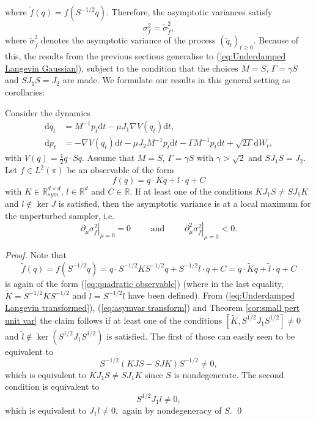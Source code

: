 where $\widetilde{f}(q)=f(S^{-1/2}q)$. Therefore, the asymptotic variances
satisfy
\begin{equation}
\sigma_{f}^{2}=\widetilde{\sigma}_{\widetilde{f}}^{2},\label{eq:asymvar transform}
\end{equation}
where $\widetilde{\sigma}_{\widetilde{f}}^{2}$ denotes the asymptotic variance
of the process $(\widetilde{q}_{t})_{t\ge0}$. Because of this, the results
from the previous sections generalise to (\ref{eq:Underdamped Langevin Gaussian}),
subject to the condition that the choices $M=S$, $\Gamma=\gamma S$
and $SJ_{1}S=J_{2}$ are made. We formulate our results in this general
setting as corollaries:
\begin{corollary}
	\label{cor:small_pert_general}
	Consider the dynamics 
	\begin{align}
	\mathrm{d}q_{t} & =M^{-1}p_{t}\mathrm{d}t-\mu J_{1}\nabla V(q_{t})\mathrm{d}t,\nonumber \\
	\mathrm{d}p_{t} & =-\nabla V(q_{t})\mathrm{d}t-\mu J_{2}M^{-1}p_{t}\mathrm{d}t-\Gamma M^{-1}p_{t}\mathrm{d}t+\sqrt{2\Gamma}\mathrm{d}W_{t},\label{eq: perturbed Langevin corollary}
	\end{align}
	with $V(q)=\frac{1}{2}q\cdot Sq$. Assume that $M=S$, $\Gamma=\gamma S$
	with $\gamma > \sqrt{2}$ and $SJ_{1}S=J_{2}$. Let $f\in L^{2}(\pi)$ be an observable of the form 
	\begin{equation}
	f(q)=q\cdot Kq+l\cdot q+C\label{eq:quadratic observable}
	\end{equation}
	with $K\in\mathbb{R}_{sym}^{d\times d}$, $l\in\mathbb{R}^{d}$ and
	$C\in\mathbb{R}$. If at least one of the conditions $KJ_{1}S\neq SJ_{1}K$
	and $l \notin \ker J$ is satisfied, then the asymptotic variance is at a local maximum for the unperturbed sampler, i.e.
	\[
	\left. \partial_{\mu}\sigma_{f}^{2}\right\rvert_{\mu=0}=0\qquad \mbox{ and } \qquad 	\left. \partial_{\mu}^{2}\sigma_{f}^{2}\right\rvert_{\mu=0}<0.
	\]
\end{corollary}
\begin{proof}
	Note that 
	\[
	\widetilde{f}(q)=f(S^{-1/2}q)=q\cdot S^{-1/2}KS^{-1/2}q+S^{-1/2}l\cdot q+C=q\cdot\widetilde{K}q+\widetilde{l}\cdot q+C
	\]
	is again of the form (\ref{eq:quadratic observable}) (where in the
	last equality, $\widetilde{K}=S^{-1/2}KS^{-1/2}$ and $\widetilde{l}=S^{-1/2}l$
	have been defined). From (\ref{eq:Underdamped Langevin transformed}),
	(\ref{eq:asymvar transform}) and Theorem \ref{cor:small pert unit var}
	the claim follows if at least one of the conditions $[\widetilde{K},S^{1/2}J_{1}S^{1/2}]\neq0$
	and $\widetilde{l}\notin\ker(S^{1/2}J_{1}S^{1/2})$ is satisfied. The
	first of those can easily seen to be equivalent to 
	\[
	S^{-1/2}(KJS-SJK)S^{-1/2}\neq0,
	\]
	which is equivalent to $KJ_{1}S\neq SJ_{1}K$ since $S$ is nondegenerate.
	The second condition is equivalent to 
	\[
	S^{1/2}J_{1}l\neq0,
	\]
	which is equivalent to $J_{1}l\neq0,$ again by nondegeneracy of $S$. \qed \end{proof}
